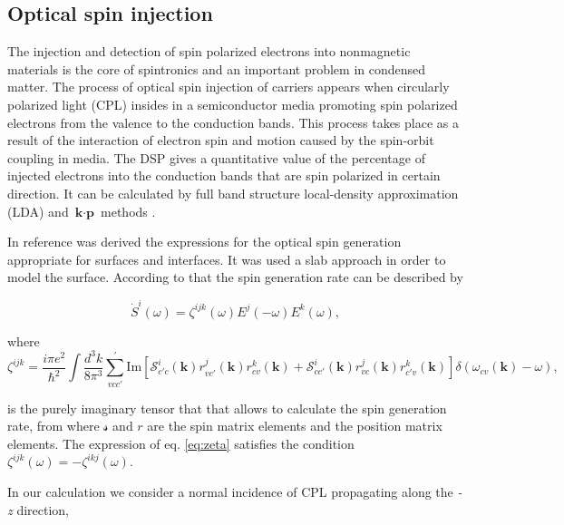 \documentclass[pss]{wiley2sp} %
\begin{document}
\subsection{Optical spin injection}

The injection and detection of spin polarized electrons into nonmagnetic
materials is the core of spintronics \cite{vzutic2004spintronics,fert2008nobel,pezzoli2012optical,bottegoni2013experimental,bottegoni2013photoinduced} and an
important problem in condensed matter. The process of optical spin injection of
carriers appears when circularly polarized light (CPL)
\cite{dyakonov1984theory} insides in a semiconductor media promoting spin
polarized electrons from the valence to the conduction bands. This process
takes place as a result of the interaction of electron spin and motion caused
by the spin-orbit coupling in media. The DSP gives a quantitative value of the
percentage of injected electrons into the conduction bands that are spin
polarized in certain direction. It can be calculated by full band structure local-density
approximation (LDA) and $\textbf{k}\cdot \textbf{p}$ methods
\cite{nastos2007full,cabellos2009stress}.

In reference \cite{mendoza2012optical} was derived the expressions for the optical spin generation
appropriate for surfaces and interfaces. It was used a
slab approach in order to model the surface. According to that the spin generation rate can be described by

\begin{equation}
    \dot{S}^{i} (\omega) = \zeta^{ijk} (\omega) E^{j} (-\omega) E^{k} (\omega),
\end{equation}

where
\begin{equation}
    \zeta^{ijk} = \frac{i \pi e^{2}}{\hbar^{2}} \int \frac{d^{3}k}{8\pi^{3}} \sum_{vcc'}^{'} \text{Im} \left[  \mathcal{S}^{i}_{c'c} (\textbf{k}) r^{j}_{vc'}(\textbf{k}) r^{k}_{cv}(\textbf{k})
    + \mathcal{S}^{i}_{cc'} (\textbf{k}) r^{j}_{vc}(\textbf{k}) r^{k}_{c'v}(\textbf{k}) \right] \delta (\omega_{cv}(\textbf{k}) -\omega), \label{eq:zeta}
\end{equation}

is the purely imaginary tensor that that allows to calculate the spin generation rate, from where $\mathcal{s} $ and $r$ are the spin matrix elements and the position matrix elements. The expression of eq. \ref{eq:zeta} satisfies the condition  $\zeta^{ijk} (\omega) = -\zeta^{ikj} (\omega)$. 


In our calculation we consider a normal incidence of CPL propagating along the \emph{-z} direction,
\end{document}
